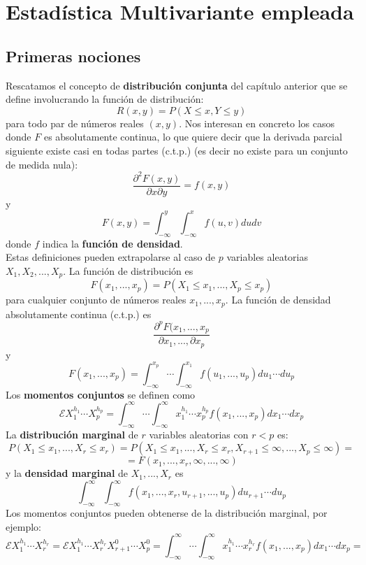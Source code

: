 
\chapter{Estadística Multivariante empleada}
\section{Primeras nociones}
Rescatamos el concepto de \textbf{distribución conjunta} del capítulo anterior que se define involucrando la función de distribución:
\[ R(x,y)=P(X \leq x, Y \leq y) \]
para todo par de números reales $(x,y)$. Nos interesan en concreto los casos donde $F$ es absolutamente continua, lo que quiere decir que la derivada parcial siguiente existe casi en todas partes (c.t.p.) (es decir no existe para un conjunto de medida nula):
\[ \frac{\partial^{2} F(x,y)}{\partial x \partial y}=f(x,y) \]
y 
\[ F(x,y) = \int_{-\infty}^{y} \int_{-\infty}^{x} f(u,v) du dv   \]
donde $f$ indica la \textbf{función de densidad}.\\
Estas definiciones pueden extrapolarse al caso de $p$ variables aleatorias $X_{1},X_{2},...,X_{p}$. La función de distribución es
\[ F(x_{1},...,x_{p})=P(X_{1} \leq x_{1},...,X_{p} \leq x_{p}) \]
para cualquier conjunto de números reales $x_{1},...,x_{p}$. La función de densidad absolutamente continua (c.t.p.) es
\[ \frac{\partial^{p} F(x_{1},...,x_{p}}{\partial x_{1},...,\partial x_{p}} \]
y 
\[ F(x_{1},...,x_{p})= \int_{-\infty}^{x_{p}} \dotsb \int_{-\infty}^{x_{1}} f(u_{1},...,u_{p})du_{1} \dotsb du_{p} \]
Los \textbf{momentos conjuntos} se definen como
\[ \mathcal{E} X_{1}^{h_{1}} \dotsb X_{p}^{h_{p}} = \int_{-\infty}^{\infty} \dotsb \int_{-\infty}^{\infty} x_{1}^{h_{1}} \dotsb x_{p}^{h_{p}} f(x_{1},...,x_{p})dx_{1} \dotsb dx_{p} \]
La \textbf{distribución marginal} de $r$ variables aleatorias con $r<p$ es:
\[ P(X_{1} \leq x_{1},...,X_{r} \leq x_{r})= P(X_{1} \leq x_{1},...,X_{r} \leq x_{r}, X_{r+1} \leq \infty,...,X_{p} \leq \infty)= \]
\[ =F(x_{1},...,x_{r},\infty,...,\infty) \]
y la \textbf{densidad marginal} de $X_{1},...,X_{r}$ es
\[ \int_{-\infty}^{\infty} \int_{-\infty}^{\infty} f(x_{1},...,x_{r},u_{r+1},...,u_{p})du_{r+1} \dotsb du_{p} \]
Los momentos conjuntos pueden obtenerse de la distribución marginal, por ejemplo:
\[ \mathcal{E} X_{1}^{h_{1}} \dotsb X_{r}^{h_{r}} = \mathcal{E} X_{1}^{h_{1}} \dotsb X_{r}^{h_{r}} X_{r+1}^{0} \dotsb X_{p}^{0} = \int_{-\infty}^{\infty} \dotsb \int_{-\infty}^{\infty} x_{1}^{h_{1}} \dotsb x_{r}^{h_{r}} f(x_{1},...,x_{p})dx_{1} \dotsb dx_{p}= \]
